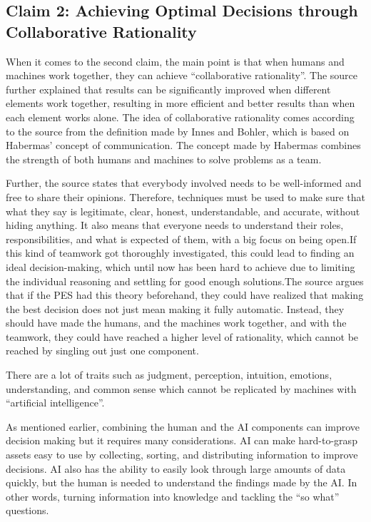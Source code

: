 \subsection{Claim 2: Achieving Optimal Decisions through Collaborative Rationality}
When it comes to the second claim, the main point is that when humans and machines work together, they can achieve “collaborative rationality”. The source further explained that results can be significantly improved when different elements work together, resulting in more efficient and better results than when each element works alone. The idea of collaborative rationality comes according to the source from the definition made by Innes and Bohler, which is based on Habermas’ concept of communication. The concept made by Habermas combines the strength of both humans and machines to solve problems as a team. 

Further, the source states that everybody involved needs to be well-informed and free to share their opinions. Therefore, techniques must be used to make sure that what they say is legitimate, clear, honest, understandable, and accurate, without hiding anything. It also means that everyone needs to understand their roles, responsibilities, and what is expected of them, with a big focus on being open.If this kind of teamwork got thoroughly investigated, this could lead to finding an ideal decision-making, which until now has been hard to achieve due to limiting the individual reasoning and settling for good enough solutions.The source argues that if the PES had this theory beforehand, they could have realized that making the best decision does not just mean making it fully automatic. Instead, they should have made the humans, and the machines work together, and with the teamwork, they could have reached a higher level of rationality, which cannot be reached by singling out just one component. 

There are a lot of traits such as judgment, perception, intuition, emotions, understanding, and common sense which cannot be replicated by machines with “artificial intelligence”. 


As mentioned earlier, combining the human and the AI components can improve decision making but it requires many considerations. AI can make hard-to-grasp assets easy to use by collecting, sorting, and distributing information to improve decisions. AI also has the ability to easily look through large amounts of data quickly, but the human is needed to understand the findings made by the AI. In other words, turning information into knowledge and tackling the “so what” questions.


